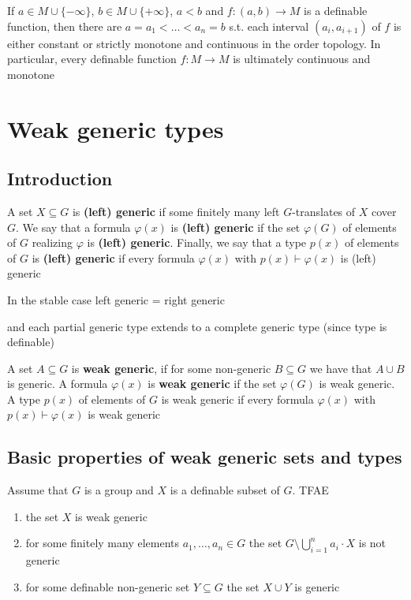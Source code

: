 \documentclass[11pt]{article}
\begin{document}
If \(a\in M\cup\{-\infty\}\), \(b\in M\cup\{+\infty\}\), \(a<b\) and \(f:(a,b)\to M\) is a definable function, then there
are \(a=a_1<\dots<a_n=b\) s.t. each interval \((a_i,a_{i+1})\) of \(f\) is either constant or
strictly monotone and continuous in the order topology. In particular, every definable
function \(f:M\to M\) is ultimately continuous and monotone

\section{Weak generic types}
\label{sec:org68491fb}
\subsection{Introduction}
\label{sec:org8aea476}
\begin{definition}[]
A set \(X\subseteq G\) is \textbf{(left) generic} if some finitely many left \(G\)-translates of \(X\)
cover \(G\). We say that a formula \(\varphi(x)\) is \textbf{(left) generic} if the set \(\varphi(G)\) of elements
of \(G\) realizing \(\varphi\) is \textbf{(left) generic}. Finally, we say that a type \(p(x)\) of elements
of \(G\) is \textbf{(left) generic} if every formula \(\varphi(x)\) with \(p(x)\vdash\varphi(x)\) is (left) generic
\end{definition}

In the stable case left generic = right generic \label{Problem1}

and each partial generic type extends to a complete generic type (since type is definable)

\begin{definition}[]
A set \(A\subseteq G\) is \textbf{weak generic}, if for some non-generic \(B\subseteq G\) we have that \(A\cup B\) is
generic. A formula \(\varphi(x)\) is \textbf{weak generic} if the set \(\varphi(G)\) is weak generic. A type \(p(x)\)
of elements of \(G\) is weak generic if every formula \(\varphi(x)\) with \(p(x)\vdash\varphi(x)\) is weak generic
\end{definition}

\subsection{Basic properties of weak generic sets and types}
\label{sec:orgdca1d9c}
\begin{lemma}[]
\label{3.2.1}
Assume that \(G\) is a group and \(X\) is a definable subset of \(G\). TFAE
\begin{enumerate}
\item the set \(X\) is weak generic
\item for some finitely many elements \(a_1,\dots,a_n\in G\) the set \(G\setminus\bigcup_{i=1}^na_i\cdot X\) is not generic
\item for some definable non-generic set \(Y\subseteq G\) the set \(X\cup Y\) is generic
\end{enumerate}
\end{lemma}
\end{document}
